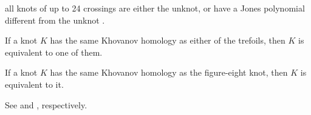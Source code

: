     all knots of up to 24 crossings are either the unknot, or have a
    Jones polynomial different from the unknot
    \cite{VerificationUnknotJonesConjUpTo24}.
    \begin{theorem}
        If a knot $K$ has the same Khovanov homology as either of the
        trefoils, then $K$ is equivalent to one of them.
    \end{theorem}
    \begin{theorem}
        If a knot $K$ has the same Khovanov homology as the figure-eight
        knot, then $K$ is equivalent to it.
    \end{theorem}
    See \cite{BaldwinSivekKhovanovTrefoils} and
    \cite{BaldwinDowlinKhovanovFigureEight}, respectively.
